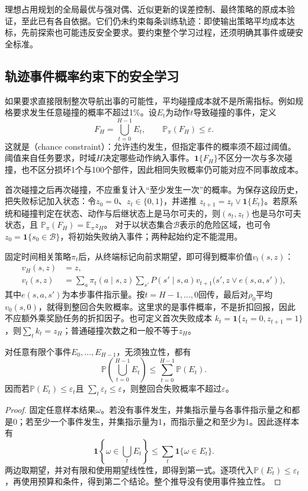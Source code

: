 理想占用规划的全局最优与强对偶、近似更新的误差控制、最终策略的原成本验证，至此已有各自依据。它们仍未约束每条训练轨迹：即使输出策略平均成本达标，先前探索也可能违反安全要求。要约束整个学习过程，还须明确其事件或硬安全标准。

\subsection{轨迹事件概率约束下的安全学习}
\label{sec:rl-trustworthy-chance}

如果要求直接限制整次导航出事的可能性，平均碰撞成本就不是所需指标。例如规格要求发生任意碰撞的概率不超过1\%。设$E_t$为动作$t$导致碰撞的事件，定义
\[
  F_H=\bigcup_{t=0}^{H-1}E_t,\qquad
  \mathbb P_\pi(F_H)\leq\varepsilon.
\]
这就是（chance constraint）：允许违约发生，但指定事件的概率须不超过阈值。阈值来自任务要求，时域$H$决定哪些动作纳入事件。$\mathbf1\{F_H\}$不区分一次与多次碰撞，也不区分损坏1个与100个部件，因此相同失败概率仍可能对应不同事故成本。

首次碰撞之后再次碰撞，不应重复计入“至少发生一次”的概率。为保存这段历史，把失败标记加入状态：令$z_0=0$、$z_t\in\{0,1\}$，并递推
$z_{t+1}=z_t\lor\mathbf1\{E_t\}$。若原系统和碰撞判定在状态、动作与后继状态上是马尔可夫的，则$(s_t,z_t)$也是马尔可夫状态，且
$\mathbb P_\pi(F_H)=\mathbb E_\pi z_H$。
对于以状态集合$\mathcal B$表示的危险区域，也可令$z_0=\mathbf1\{s_0\in\mathcal B\}$，将初始失败纳入事件；两种起始约定不能混用。

固定时间相关策略$\pi_t$后，从终端标记向前求期望，即可得到概率价值$v_t(s,z)$：
\begin{align}
  v_H(s,z)&=z,\nonumber\\
  v_t(s,z)&=\sum_a\pi_t(a\mid s,z)
       \sum_{s'}P(s'\mid s,a)
         v_{t+1}\bigl(s',z\lor e(s,a,s')\bigr),
  \label{eq:rl-trustworthy-probability-value}
\end{align}
其中$e(s,a,s')$为本步事件指示量。按$t=H-1,\ldots,0$回传，最后对$\rho_0$平均$v_0(s,0)$，就得到整回合失败概率。这里求的是事件概率，不是折扣回报，因此不应额外乘奖励任务的折扣因子。也可定义首次失败成本
$k_t=\mathbf1\{z_t=0,z_{t+1}=1\}$，则$\sum_tk_t=z_H$；普通碰撞次数之和一般不等于$z_H$。

\begin{theorem}[风险预算的并集界]
  \label{thm:rl-trustworthy-union-bound}
  对任意有限个事件$E_0,\ldots,E_{H-1}$，无须独立性，都有
  \[
    \mathbb P\left(\bigcup_{t=0}^{H-1}E_t\right)
      \leq\sum_{t=0}^{H-1}\mathbb P(E_t).
  \]
  因而若$\mathbb P(E_t)\leq\varepsilon_t$且
  $\sum_t\varepsilon_t\leq\varepsilon$，则整回合失败概率不超过$\varepsilon$。
\end{theorem}
\begin{proof}
  固定任意样本结果$\omega$。若没有事件发生，并集指示量与各事件指示量之和都是0；若至少一个事件发生，并集指示量为1，而指示量之和至少为1。因此逐样本有
  \[
    \mathbf1\left\{\omega\in\bigcup_tE_t\right\}
      \leq\sum_t\mathbf1\{\omega\in E_t\}.
  \]
  两边取期望，并对有限和使用期望线性性，即得到第一式。逐项代入$\mathbb P(E_t)\leq\varepsilon_t$，再使用预算和条件，得到第二个结论。整个推导没有使用事件独立性。
\end{proof}

